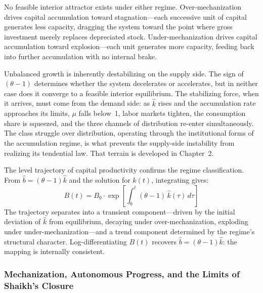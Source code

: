 No feasible interior attractor exists under either regime. Over-mechanization drives capital accumulation toward stagnation---each successive unit of capital generates less capacity, dragging the system toward the point where gross investment merely replaces depreciated stock. Under-mechanization drives capital accumulation toward explosion---each unit generates more capacity, feeding back into further accumulation with no internal brake.

Unbalanced growth is inherently destabilizing on the supply side. The sign of $(\theta - 1)$ determines whether the system decelerates or accelerates, but in neither case does it converge to a feasible interior equilibrium. The stabilizing force, when it arrives, must come from the demand side: as $\hat{k}$ rises and the accumulation rate approaches its limits, $\mu$ falls below~1, labor markets tighten, the consumption share is squeezed, and the three channels of distribution re-enter simultaneously. The class struggle over distribution, operating through the institutional forms of the accumulation regime, is what prevents the supply-side instability from realizing its tendential law. That terrain is developed in Chapter~2.

The level trajectory of capital productivity confirms the regime classification. From $\hat{b} = (\theta - 1)\hat{k}$ and the solution for $\hat{k}(t)$, integrating gives:
%
\begin{equation}\label{eq:B_trajectory}
	B(t) = B_0 \cdot \exp\left[\int_0^t (\theta - 1)\,\hat{k}(\tau)\,d\tau\right]
\end{equation}
%
The trajectory separates into a transient component---driven by the initial deviation of $\hat{k}$ from equilibrium, decaying under over-mechanization, exploding under under-mechanization---and a trend component determined by the regime's structural character. Log-differentiating $B(t)$ recovers $\hat{b} = (\theta - 1)\hat{k}$: the mapping is internally consistent.



\subsubsection{Mechanization, Autonomous Progress, and the Limits of Shaikh's Closure}
\label{sec:extended_closure}

